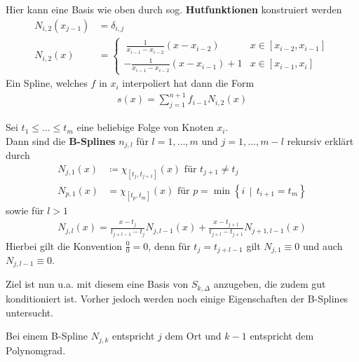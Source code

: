 \begin{Bspe}
\begin{enumerate}[a)]
    Hier kann eine Basis wie oben durch sog. 
    \textbf{Hutfunktionen}
    konstruiert werden
    \begin{align*}
      N_{i,2}(x_{j-1}) &= \delta_{i,j}\\
      N_{i,2}(x) &= \begin{cases}
        ~\frac{1}{x_{i-1}-x_{i-2}}(x-x_{i-2}) & x\in [x_{i-2}, x_{i-1}]\\
        -\frac{1}{x_{i-1}-x_{i-2}}(x-x_{i-1})+1 & x\in [x_{i-1}, x_i]
      \end{cases}
    \end{align*}
    \label{im6.2.4(3)}
    Ein Spline, welches $f$ in $x_i$ interpoliert hat dann die Form
    \begin{gather*}
      s(x) = \sum_{j=1}^{n+1}f_{i-1}N_{i,2}(x)
    \end{gather*}
  \end{enumerate}
\end{Bspe}


\begin{Defe}
  Sei $t_1\leq \dots \leq t_m$ eine beliebige Folge von Knoten
  $x_i$.\\
  Dann sind die \textbf{B-Splines}
  $n_{j,l}$ für $l=1,\dots, m$ und $j=1,\dots, m-l$ 
  rekursiv erklärt durch
  \begin{align}\nonumber
    N_{j,1}(x) &\coloneqq \chi_{[t_j,t_{j+1}]}(x) 
                 \text{ für } t_{j+1}\neq t_j\\
    N_{p,1}(x) &= \chi_{[t_p,t_m]}(x) 
                 \text{ für }
                 p=\min\left\{i\,\middle\vert\,t_{i+1}=t_m\right\}
                 \label{VI.2.3}
  \end{align}
  sowie für $l>1$
  \begin{gather}
    N_{j,l} (x) = \frac{x-t_j}{t_{j+l-1}-t_j}N_{j,l-1}(x) 
    +  \frac{x-t_{j+1}}{t_{j+l}-t_{j+1}}N_{j+1,l-1}(x) 
    \label{VI.2.4}
  \end{gather}
  Hierbei gilt die Konvention $\frac{0}{0}=0$, 
  denn für $t_j=t_{j+l-1}$ gilt
  $N_{j,1}\equiv 0$ und auch $N_{j,l-1}\equiv 0$.
\end{Defe}


Ziel ist nun u.a. mit diesem eine Basis von $S_{k,\Delta}$ anzugeben,
die zudem gut konditioniert ist.
Vorher jedoch werden noch einige Eigenschaften der B-Splines
untersucht.


\label{6.2.6}
Bei einem B-Spline $N_{j,k}$ entspricht $j$ dem Ort und
$k-1$ entspricht dem Polynomgrad.

